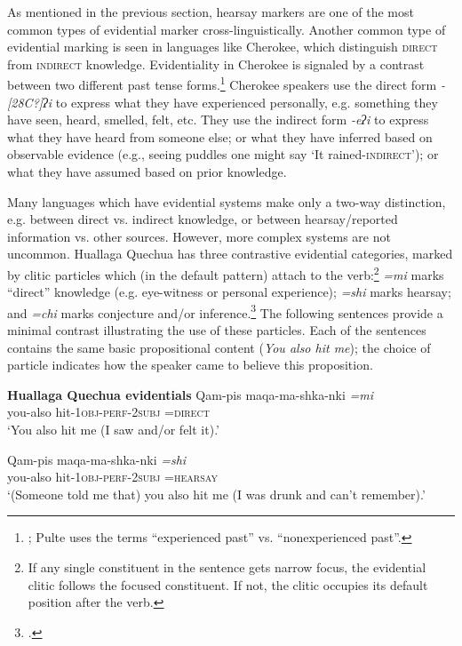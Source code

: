As mentioned in the previous section, hearsay markers are one of the most common types of evidential marker cross-linguistically. Another common type of evidential marking is seen in languages like Cherokee, which distinguish \textsc{direct} from \textsc{indirect} knowledge. Evidentiality in Cherokee is signaled by a contrast between two different past tense forms.\footnote{\citet{Pulte1985}; Pulte uses the terms “experienced past” vs. “nonexperienced past”.} Cherokee speakers use the direct form \textit{-[28C?]ʔi} to express what they have experienced personally, e.g. something they have seen, heard, smelled, felt, etc. They use the indirect form \textit{-eʔi} to express what they have heard from someone else; or what they have inferred based on observable evidence (e.g., seeing puddles one might say ‘It rained-\textsc{indirect}’); or what they have assumed based on prior knowledge.



Many languages which have evidential systems make only a two-way distinction, e.g. between direct vs. indirect knowledge, or between hearsay/reported information vs. other sources. However, more complex systems are not uncommon. Huallaga Quechua has three contrastive evidential categories, marked by clitic particles which (in the default pattern) attach to the verb:\footnote{If any single constituent in the sentence gets narrow focus, the evidential clitic follows the focused constituent. If not, the clitic occupies its default position after the verb.} \textit{=mi} marks “direct” knowledge (e.g. eye-witness or personal experience); \textit{=shi} marks hearsay; and \textit{=chi} marks conjecture and/or inference.\footnote{\citet{Weber1989}.} The following sentences provide a minimal contrast illustrating the use of these particles. Each of the sentences contains the same basic propositional content (\textit{You also hit me}); the choice of particle indicates how the speaker came to believe this proposition.


\ea

  \textbf{Huallaga Quechua evidentials} \citep[421]{Weber1989}
\ea
\gll Qam-pis  maqa-ma-shka-nki  \textit{=mi}\\
you-also  hit-1\textsc{obj}-\textsc{perf-2subj  =direct}\\
\glt ‘You also hit me (I saw and/or felt it).’

\ex \gll Qam-pis  maqa-ma-shka-nki  \textit{=shi}\\
you-also  hit-1\textsc{obj}-\textsc{perf-2subj  =hearsay}\\
\glt ‘(Someone told me that) you also hit me (I was drunk and can’t remember).’

